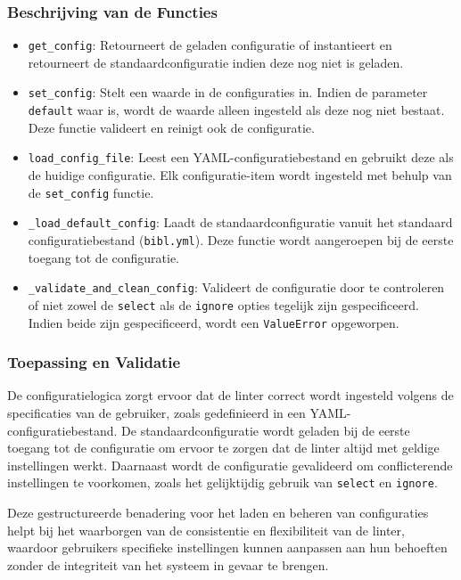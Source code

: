 \subsubsection{Beschrijving van de Functies}

\begin{itemize}
    \item \texttt{get\_config}: Retourneert de geladen configuratie of instantieert en retourneert de standaardconfiguratie indien deze nog niet is geladen.
    \item \texttt{set\_config}: Stelt een waarde in de configuraties in. Indien de parameter \texttt{default} waar is, wordt de waarde alleen ingesteld als deze nog niet bestaat. Deze functie valideert en reinigt ook de configuratie.
    \item \texttt{load\_config\_file}: Leest een YAML-configuratiebestand en gebruikt deze als de huidige configuratie. Elk configuratie-item wordt ingesteld met behulp van de \texttt{set\_config} functie.
    \item \texttt{\_load\_default\_config}: Laadt de standaardconfiguratie vanuit het standaard configuratiebestand (\texttt{bibl.yml}). Deze functie wordt aangeroepen bij de eerste toegang tot de configuratie.
    \item \texttt{\_validate\_and\_clean\_config}: Valideert de configuratie door te controleren of niet zowel de \texttt{select} als de \texttt{ignore} opties tegelijk zijn gespecificeerd. Indien beide zijn gespecificeerd, wordt een \texttt{ValueError} opgeworpen.
\end{itemize}

\subsubsection{Toepassing en Validatie}

De configuratielogica zorgt ervoor dat de linter correct wordt ingesteld volgens de specificaties van de gebruiker, zoals gedefinieerd in een YAML-configuratiebestand. De standaardconfiguratie wordt geladen bij de eerste toegang tot de configuratie om ervoor te zorgen dat de linter altijd met geldige instellingen werkt. Daarnaast wordt de configuratie gevalideerd om conflicterende instellingen te voorkomen, zoals het gelijktijdig gebruik van \texttt{select} en \texttt{ignore}.

Deze gestructureerde benadering voor het laden en beheren van configuraties helpt bij het waarborgen van de consistentie en flexibiliteit van de linter, waardoor gebruikers specifieke instellingen kunnen aanpassen aan hun behoeften zonder de integriteit van het systeem in gevaar te brengen.
